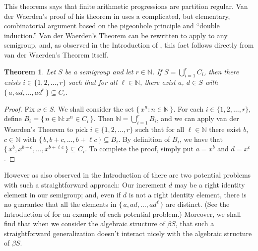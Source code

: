 \documentclass[12pt]{article}
\theoremstyle{plain}
\newtheorem{thm}{Theorem}[section]
\theoremstyle{definition}
\newcommand{\bbN}{\mathbb{N}}
\begin{document}
This theorems says that finite arithmetic progressions are
partition regular. 
Van der Waerden's proof of his theorem in
\cite{Van-der-Waerden:1927fk} uses a complicated, but elementary,
combinatorial argument based on the pigeonhole principle and ``double
induction.''%
Van der Waerden's Theorem can be rewritten to apply to any semigroup,
and, as observed in the Introduction of \cite{Bergelson:1992fk}, this
fact follows directly from van der Waerden's Theorem itself.

\begin{thm}
  Let $S$ be a semigroup and let $r \in \bbN$.
  If $S = \bigcup_{i=1}^r C_i$, then there exists $i \in \{1, 2,
  \ldots, r\}$ such that for all $\ell \in \bbN$, there exist $a$, $d
  \in S$ with $\{\, a , ad, \ldots, ad^\ell \,\} \subseteq C_i$. 
\end{thm}
\begin{proof}
  Fix $x \in S$.
  We shall consider the set $\{\, x^n : n \in \bbN \,\}$.
  For each $i \in \{1, 2, \ldots, r\}$, define $B_i = \{\, n \in \bbN
  : x^n \in C_i \,\}$.
  Then $\bbN = \bigcup_{i=1}^r B_i$, and we can apply van der
  Waerden's Theorem to pick $i \in \{1, 2, \ldots, r\}$ such that for
  all $\ell \in \bbN$ there exist $b$, $c \in \bbN$ with $\{\, b, b+c,
  \ldots, b+\ell c \,\} \subseteq B_i$. 
  By definition of $B_i$, we have that $\{\, x^b, x^{b+c}, \ldots,
  x^{b+ \ell c} \,\} \subseteq C_i$. 
  To complete the proof, simply put $a = x^b$ and $d = x^c$. 
\end{proof}

However as also observed in the Introduction of
\cite{Bergelson:1992fk} there are two potential problems with such a
straightforward approach:
Our increment $d$ may be a right identity element in our semigroup;
and, even if $d$ is not a right identity element, there is no
guarantee that all the elements in $\{\, a, ad, \ldots, ad^{\ell}
\,\}$ are distinct. 
(See the Introduction of \cite{Bergelson:1992fk} for an example of
each potential problem.)
Moreover, we shall find that when we consider the algebraic structure
of $\beta S$, that such a straightforward generalization doesn't
interact nicely with the algebraic structure of $\beta S$. 
\end{document}
